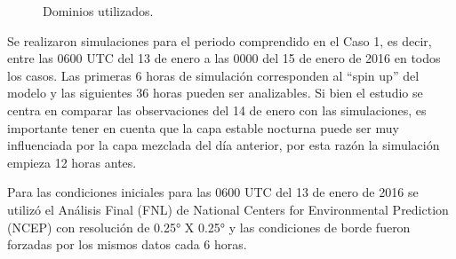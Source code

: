 \documentclass[12pt,spanish,oneside]{book}
\begin{document}
\begin{figure}

{\centering {}\hfill{}

}

\caption{Dominios utilizados. \label{dominio}}\label{fig:dominio}
\end{figure}

Se realizaron simulaciones para el periodo comprendido en el Caso 1, es
decir, entre las 0600 UTC del 13 de enero a las 0000 del 15 de enero de
2016 en todos los casos. Las primeras 6 horas de simulación corresponden
al ``spin up'' del modelo y las siguientes 36 horas pueden ser
analizables. Si bien el estudio se centra en comparar las observaciones
del 14 de enero con las simulaciones, es importante tener en cuenta que
la capa estable nocturna puede ser muy influenciada por la capa mezclada
del día anterior, por esta razón la simulación empieza 12 horas antes.

Para las condiciones iniciales para las 0600 UTC del 13 de enero de 2016
se utilizó el Análisis Final (FNL) de National Centers for Environmental
Prediction (NCEP) con resolución de 0.25° X 0.25° y las condiciones de
borde fueron forzadas por los mismos datos cada 6 horas.
\end{document}
